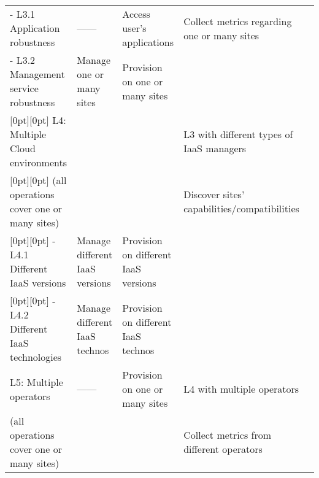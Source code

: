 \begin{tabular}{@{} l L L L @{} >{\kern\tabcolsep}l @{}}
    - L3.1 Application robustness&
    \hfill ------ \hfill &
    Access user's applications&
    Collect metrics regarding one or many sites\\

    - L3.2 Management service robustness&
    Manage one or many sites &
    Provision on one or many sites&
    \\

    [0pt][0pt]
    L4: Multiple Cloud environments &
    &
    &
    L3 with different types of IaaS managers\\ 

    [0pt][0pt]
    (all operations cover one or many sites) &
    &
    &
    Discover sites' capabilities/compatibilities\\

    [0pt][0pt]
    - L4.1 Different IaaS versions&
    Manage different IaaS versions&
    Provision on different IaaS versions&
    \\
    
    [0pt][0pt]
    - L4.2 Different IaaS technologies&
    Manage different IaaS technos&
    Provision on different IaaS technos&
    \\

    L5: Multiple operators &
    \hfill ------ \hfill &
    Provision on one or many sites&
    L4 with multiple operators\\ 

    (all operations cover one or many sites) &
    &
    &
    Collect metrics from different operators\\
    \bottomrule

\end{tabular}

